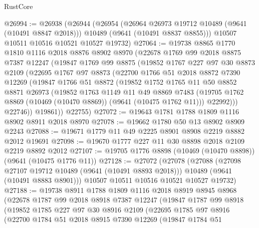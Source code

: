 \begin{lexlean}{RustCore}
\begin{coremodule}
@26994 := @26938
    (@26944
      (@26954
        (@26964 @26973 @19712 @10489 (@9641 (@10491 @8847 @2018)))
        @10489
        (@9641 (@10491 @8837 @8855)))
      @10507
      @10511
      @10516
      @10521
      @10527
      @19732)
@27064 := @19738
    @8865
    @1770
    @1810
    @1116
    @2018
    @8876
    @8902
    @8970
    (@22678
      @1769
      @99
      @2018
      @8875
      @7387
      @12247
      (@19847
        @1769
        @99
        @8875
        (@19852
          @1767
          @227
          @97
          @30
          @8873
          @2109
          (@22695
            @1767
            @97
            @8873
            (@22700
              @1766
              @51
              @2018
              @8872
              @7390
              @12269
              (@19847
                @1766
                @51
                @8872
                (@19852
                  @1752
                  @1765
                  @11
                  @50
                  @8852
                  @8871
                  @26973
                  (@19852
                    @1763
                    @1149
                    @11
                    @49
                    @8869
                    @7483
                    (@19705 @1762 @8869 (@10469 (@10470 @8869)) (@9641 (@10475 @1762 @11)))
                    @22992)))
              @22746))
          @19861))
      @22755)
@27072 := @19643 @1781 @1788 @1809 @1116 @8902 @8911 @2018 @8970
@27078 := @19662 @1780 @50 @13 @8902 @8909 @2243
@27088 := @19671 @1779 @11 @49 @2225 @8901 @8908 @2219 @8882 @2012 @19691
@27098 := @19670 @1777 @227 @11 @30 @8898 @2018 @2109 @2219 @8892 @2012
@27107 := @19705 @1776 @8898 (@10469 (@10470 @8898)) (@9641 (@10475 @1776 @11))
@27128 := @27072
    (@27078
      (@27088
        (@27098 @27107 @19712 @10489 (@9641 (@10491 @8893 @2018)))
        @10489
        (@9641 (@10491 @8883 @8901)))
      @10507
      @10511
      @10516
      @10521
      @10527
      @19732)
@27188 := @19738
    @8911
    @1788
    @1809
    @1116
    @2018
    @8919
    @8945
    @8968
    (@22678
      @1787
      @99
      @2018
      @8918
      @7387
      @12247
      (@19847
        @1787
        @99
        @8918
        (@19852
          @1785
          @227
          @97
          @30
          @8916
          @2109
          (@22695
            @1785
            @97
            @8916
            (@22700
              @1784
              @51
              @2018
              @8915
              @7390
              @12269
              (@19847
                @1784
                @51

\end{coremodule}
\end{lexlean}
